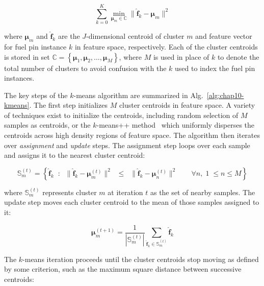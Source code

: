 \begin{equation}
\label{eqn:chap10-kmeans-inertia}
\displaystyle\sum\limits_{k=0}^{K} \min_{\boldsymbol{\mu}_{m} \in \mathbb{C}} \|\boldsymbol{\hat{f}}_{k} - \boldsymbol{\mu}_{m}\|^{2}
\end{equation}

\noindent where $\boldsymbol{\mu}_{m}$ and $\boldsymbol{\hat{f}}_{k}$ are the $J$-dimensional centroid of cluster $m$ and feature vector for fuel pin instance $k$ in feature space, respectively. Each of the cluster centroids is stored in set $\mathbb{C} = \left\{ \boldsymbol{\mu}_{1}, \boldsymbol{\mu}_{2}, \dots, \boldsymbol{\mu}_{M} \right\}$, where $M$ is used in place of $k$ to denote the total number of clusters to avoid confusion with the $k$ used to index the fuel pin instances.

The key steps of the $k$-means algorithm are summarized in Alg.~\ref{alg:chap10-kmeans}. The first step initializes $M$ cluster centroids in feature space. A variety of techniques exist to initialize the centroids, including random selection of $M$ samples as centroids, or the $k$-means++ method~\cite{arthur2007kmeans++} which uniformly disperses the centroids across high density regions of feature space. The algorithm then iterates over \textit{assignment} and \textit{update} steps. The assignment step loops over each sample and assigns it to the nearest cluster centroid:

\begin{equation}
\label{eqn:chap10-kmeans-assign}
\mathbb{S}_{m}^{(t)} = \left\{ \boldsymbol{\hat{f}}_{k} \;\; : \;\; \| \boldsymbol{\hat{f}}_{k} - \boldsymbol{\mu}_{m}^{(t)} \|^{2} \;\; \le \;\; \| \boldsymbol{\hat{f}}_{k} - \boldsymbol{\mu}_{n}^{(t)} \|^{2} \;\;\;\;\;\;\; \forall n, \; 1 \; \le n \le M \right\}
\end{equation}

\noindent where $\mathbb{S}_{m}^{(t)}$ represents cluster $m$ at iteration $t$ as the set of nearby samples. The update step moves each cluster centroid to the mean of those samples assigned to it:

\begin{equation}
\label{eqn:chap10-kmeans-update}
\boldsymbol{\mu}_{m}^{(t+1)} = \frac{1}{|\mathbb{S}_{m}^{(t)}|} \displaystyle\sum\limits_{\boldsymbol{\hat{f}}_{k} \in \mathbb{S}_{m}^{(t)}} \boldsymbol{\hat{f}}_{k}
\end{equation}

The $k$-means iteration proceeds until the cluster centroids stop moving as defined by some criterion, such as the maximum square distance between successive centroids:

